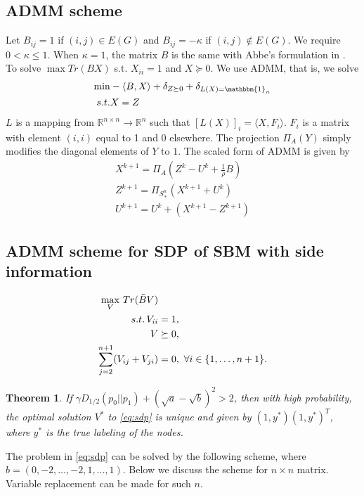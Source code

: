 \documentclass{ctexart}
\newtheorem{theorem}{Theorem}
\begin{document}
\subsection{ADMM scheme}
Let $B_{ij} = 1$ if $(i,j) \in E(G)$ and $B_{ij} = -\kappa$ if $(i,j) \not \in E(G)$.
We require $0<\kappa \leq 1$. When $\kappa = 1$, the matrix $B$ is the same with
Abbe's formulation in \cite{abbe2015exact}.
To solve $\max Tr(BX)$ s.t. $X_{ii} = 1$ and $X \succeq 0$.
We use ADMM, that is, we solve
\begin{align*}
\min & - \langle B, X\rangle + \delta_{Z \succeq 0} + \delta_{L(X) = \mathbbm{1}_n}\\
s.t.& X=Z
\end{align*}
$L$ is a mapping from $\mathbb{R}^{n \times n} \to \mathbb{R}^n$ such that $[L(X)]_i =  \langle X,F_i \rangle $.
$F_i$ is a matrix with element $(i,i)$ equal to 1 and 0 elsewhere.
The projection $\Pi_{A}(Y)$ simply modifies the diagonal elements of $Y$ to $1$.
The scaled form of ADMM \cite{boyd2011distributed} is given by
\begin{align}
X^{k+1} = \Pi_A(Z^k - U^k + \frac{1}{\rho}B)\label{eq:admm} \\
Z^{k+1} = \Pi_{S_+^n}(X^{k+1} + U^{k}) \\
U^{k+1} = U^k + (X^{k+1} - Z^{k+1}) 
\end{align}
\subsection{ADMM scheme for SDP of SBM with side information}
\begin{align}
		\max_V\, Tr(\tilde{B}V)  &\notag\\
s.t.\, V_{ii} &= 1, \notag\\
V &\succeq 0, \notag\\
\sum_{j=2}^{n+1} (V_{ij} + V_{ji})& = 0,~\forall i\in\{1,\ldots,n+1\}. \label{eq:sdp}
\end{align}

\begin{theorem}\label{thm:sdp}
	If $\gamma D_{1/2}(p_0||p_1)  + (\sqrt{a} - \sqrt{b})^2 > 2$, then with high probability, the optimal solution
	$V^*$ to \eqref{eq:sdp} is unique and given by $(1,y^*)(1,y^*)^T$, where $y^*$ is the true labeling of the nodes.
\end{theorem}
The problem in \eqref{eq:sdp} can be solved by the following scheme, where $b=(0, -2, \dots, -2, 1, \dots, 1)$. Below we discuss the scheme for $n\times n$ matrix. Variable replacement can be made
for such $n$.
\end{document}
